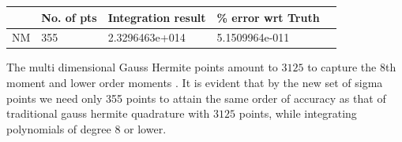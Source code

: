 \documentclass{article}
\begin{document}
\begin{center}
  \begin{tabular}{ | l | l | l | l | l | }
    \hline
                  					&   No. of pts			& Integration result 			    & \% error wrt Truth			 \\ \hline 
      NM          					&   355       		  & 2.3296463e+014              & 5.1509964e-011   \\
      \hline
  \end{tabular}
\end{center}
The multi dimensional Gauss Hermite points amount to $3125$ to capture the 8th moment and lower order moments . It is evident that by the new set of sigma points we need only 355 points to attain the same order of accuracy as that of traditional gauss hermite quadrature with $3125$ points, while integrating polynomials of degree 8 or lower.
\end{document}

